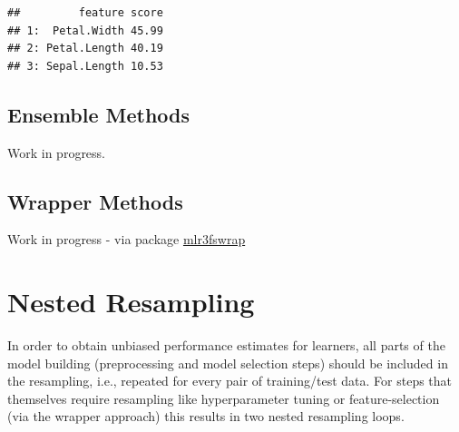 \documentclass[]{scrbook}
\newenvironment{Shaded}{\begin{snugshade}}{\end{snugshade}}
\newcommand{\DataTypeTok}[1]{\textcolor[rgb]{0.13,0.29,0.53}{#1}}
\newcommand{\DecValTok}[1]{\textcolor[rgb]{0.00,0.00,0.81}{#1}}
\newcommand{\KeywordTok}[1]{\textcolor[rgb]{0.13,0.29,0.53}{\textbf{#1}}}
\newcommand{\NormalTok}[1]{#1}
\newcommand{\OperatorTok}[1]{\textcolor[rgb]{0.81,0.36,0.00}{\textbf{#1}}}
\newcommand{\StringTok}[1]{\textcolor[rgb]{0.31,0.60,0.02}{#1}}
\renewenvironment{Shaded} {\begin{snugshade}\small} {\end{snugshade}}
\begin{document}
\begin{Shaded}
\end{Shaded}

\begin{verbatim}
##         feature score
## 1:  Petal.Width 45.99
## 2: Petal.Length 40.19
## 3: Sepal.Length 10.53
\end{verbatim}

\hypertarget{fs-ensemble}{%
\subsection{Ensemble Methods}\label{fs-ensemble}}

Work in progress.

\hypertarget{fs-wrapper}{%
\subsection{Wrapper Methods}\label{fs-wrapper}}

Work in progress - via package \href{https://github.com/mlr-org/mlr3fswrap}{mlr3fswrap}

\hypertarget{nested-resampling}{%
\section{Nested Resampling}\label{nested-resampling}}

In order to obtain unbiased performance estimates for learners, all parts of the model building (preprocessing and model selection steps) should be included in the resampling, i.e., repeated for every pair of training/test data.
For steps that themselves require resampling like hyperparameter tuning or feature-selection (via the wrapper approach) this results in two nested resampling loops.
\end{document}
